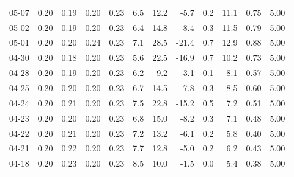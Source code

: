 \begin{threeparttable}
{\begin{tabular}{lrrrrrrrrrrr}
  05-07 &          0.20 &          0.19 &          0.20 &        0.23 &                 6.5 &                12.2 &       -5.7 &                 0.2 &             11.1 &            0.75 &                   5.00 \\
  05-02 &          0.20 &          0.19 &          0.20 &        0.23 &                 6.4 &                14.8 &       -8.4 &                 0.3 &             11.5 &            0.79 &                   5.00 \\
  05-01 &          0.20 &          0.20 &          0.24 &        0.23 &                 7.1 &                28.5 &      -21.4 &                 0.7 &             12.9 &            0.88 &                   5.00 \\
  04-30 &          0.20 &          0.18 &          0.20 &        0.23 &                 5.6 &                22.5 &      -16.9 &                 0.7 &             10.2 &            0.73 &                   5.00 \\
  04-28 &          0.20 &          0.19 &          0.20 &        0.23 &                 6.2 &                 9.2 &       -3.1 &                 0.1 &              8.1 &            0.57 &                   5.00 \\
  04-25 &          0.20 &          0.20 &          0.20 &        0.23 &                 6.7 &                14.5 &       -7.8 &                 0.3 &              8.5 &            0.60 &                   5.00 \\
  04-24 &          0.20 &          0.21 &          0.20 &        0.23 &                 7.5 &                22.8 &      -15.2 &                 0.5 &              7.2 &            0.51 &                   5.00 \\
  04-23 &          0.20 &          0.20 &          0.20 &        0.23 &                 6.8 &                15.0 &       -8.2 &                 0.3 &              7.1 &            0.48 &                   5.00 \\
  04-22 &          0.20 &          0.21 &          0.20 &        0.23 &                 7.2 &                13.2 &       -6.1 &                 0.2 &              5.8 &            0.40 &                   5.00 \\
  04-21 &          0.20 &          0.22 &          0.20 &        0.23 &                 7.7 &                12.8 &       -5.0 &                 0.2 &              6.2 &            0.43 &                   5.00 \\
  04-18 &          0.20 &          0.23 &          0.20 &        0.23 &                 8.5 &                10.0 &       -1.5 &                 0.0 &              5.4 &            0.38 &                   5.00 \\

\end{tabular}}
\end{threeparttable}
